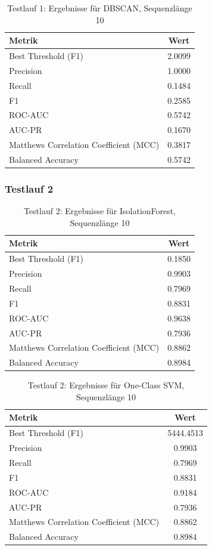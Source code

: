 \documentclass[a4paper,12pt]{article}
\begin{document}
\begin{table}[H]
	\centering
	\begin{tabular}{l c}
		\hline
		Metrik & Wert \\
		\hline
		Best Threshold (F1) & 2.0099 \\
		Precision & 1.0000 \\
		Recall & 0.1484 \\
		F1 & 0.2585 \\
		ROC-AUC & 0.5742 \\
		AUC-PR & 0.1670 \\
		Matthews Correlation Coefficient (MCC) & 0.3817 \\
		Balanced Accuracy & 0.5742 \\
		\hline
	\end{tabular}
	\caption{Testlauf 1: Ergebnisse für DBSCAN, Sequenzlänge 10}
\end{table}

\subsubsection{Testlauf 2}
\begin{table}[H]
	\centering
	\begin{tabular}{l c}
		\hline
		Metrik & Wert \\
		\hline
		Best Threshold (F1) & 0.1850 \\
		Precision & 0.9903 \\
		Recall & 0.7969 \\
		F1 & 0.8831 \\
		ROC-AUC & 0.9638 \\
		AUC-PR & 0.7936 \\
		Matthews Correlation Coefficient (MCC) & 0.8862 \\
		Balanced Accuracy & 0.8984 \\
		\hline
	\end{tabular}
	\caption{Testlauf 2: Ergebnisse für IsolationForest, Sequenzlänge 10}
\end{table}

\begin{table}[H]
	\centering
	\begin{tabular}{l c}
		\hline
		Metrik & Wert \\
		\hline
		Best Threshold (F1) & 5444.4513 \\
		Precision & 0.9903 \\
		Recall & 0.7969 \\
		F1 & 0.8831 \\
		ROC-AUC & 0.9184 \\
		AUC-PR & 0.7936 \\
		Matthews Correlation Coefficient (MCC) & 0.8862 \\
		Balanced Accuracy & 0.8984 \\
		\hline
	\end{tabular}
	\caption{Testlauf 2: Ergebnisse für One-Class SVM, Sequenzlänge 10}
\end{table}
\end{document}
